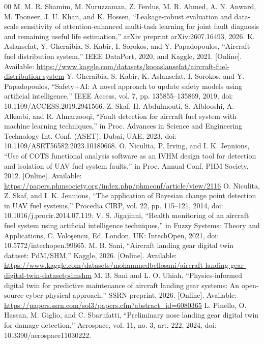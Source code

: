 \documentclass[conference]{IEEEtran}
\begin{document}
\begin{thebibliography}{00}
 M. M. R. Shamim, M. Nuruzzaman, Z. Ferdus, M. R. Ahmed, A. N. Anward, M. Tooneer, J. U. Khan, and K. Hossen, ``Leakage-robust evaluation and data-scale sensitivity of attention-enhanced multi-task learning for joint fault diagnosis and remaining useful life estimation,'' arXiv preprint arXiv:2607.16493, 2026.
 K. Aslansefat, Y. Gheraibia, S. Kabir, I. Sorokos, and Y. Papadopoulos, ``Aircraft fuel distribution system,'' IEEE DataPort, 2020, and Kaggle, 2021. [Online]. Available: \url{https://www.kaggle.com/datasets/kooaslansefat/aircraft-fuel-distribution-system}
 Y. Gheraibia, S. Kabir, K. Aslansefat, I. Sorokos, and Y. Papadopoulos, ``Safety+AI: A novel approach to update safety models using artificial intelligence,'' IEEE Access, vol. 7, pp. 135855--135869, 2019, doi: 10.1109/ACCESS.2019.2941566.
 Z. Skaf, H. Abdulmouti, S. Alblooshi, A. Alkaabi, and R. Almarzooqi, ``Fault detection for aircraft fuel system with machine learning techniques,'' in Proc. Advances in Science and Engineering Technology Int. Conf. (ASET), Dubai, UAE, 2023, doi: 10.1109/ASET56582.2023.10180668.
 O. Niculita, P. Irving, and I. K. Jennions, ``Use of COTS functional analysis software as an IVHM design tool for detection and isolation of UAV fuel system faults,'' in Proc. Annual Conf. PHM Society, 2012. [Online]. Available: \url{https://papers.phmsociety.org/index.php/phmconf/article/view/2116}
 O. Niculita, Z. Skaf, and I. K. Jennions, ``The application of Bayesian change point detection in UAV fuel systems,'' Procedia CIRP, vol. 22, pp. 115--121, 2014, doi: 10.1016/j.procir.2014.07.119.
 V. S. Jigajinni, ``Health monitoring of an aircraft fuel system using artificial intelligence techniques,'' in Fuzzy Systems: Theory and Applications, C. Volo\c{s}encu, Ed. London, UK: IntechOpen, 2021, doi: 10.5772/intechopen.99665.
 M. B. Sani, ``Aircraft landing gear digital twin dataset: PdM/SHM,'' Kaggle, 2026. [Online]. Available: \url{https://www.kaggle.com/datasets/mohammedbellosani/aircraft-landing-gear-digital-twin-datasetpdmshm}
 M. B. Sani and L. O. Uhiah, ``Physics-informed digital twin for predictive maintenance of aircraft landing gear systems: An open-source cyber-physical approach,'' SSRN preprint, 2026. [Online]. Available: \url{https://papers.ssrn.com/sol3/papers.cfm?abstract_id=6080365}
 L. Pinello, O. Hassan, M. Giglio, and C. Sbarufatti, ``Preliminary nose landing gear digital twin for damage detection,'' Aerospace, vol. 11, no. 3, art. 222, 2024, doi: 10.3390/aerospace11030222.

\end{thebibliography}
\end{document}
